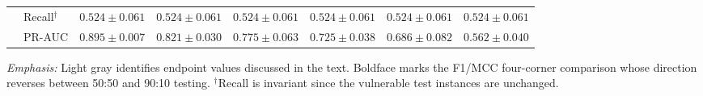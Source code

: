 \begin{table}[tbp]
{\begin{tabular}{llcccccc}
 & Recall$^{\dagger}$ & \cellcolor{black!10}$0.524 \pm 0.061$ & $0.524 \pm 0.061$ & $0.524 \pm 0.061$ & $0.524 \pm 0.061$ & $0.524 \pm 0.061$ & \cellcolor{black!10}$0.524 \pm 0.061$ \\
 & PR-AUC & $0.895 \pm 0.007$ & $0.821 \pm 0.030$ & $0.775 \pm 0.063$ & $0.725 \pm 0.038$ & $0.686 \pm 0.082$ & $0.562 \pm 0.040$ \\
\bottomrule
\end{tabular}}
\vspace{1mm}
\parbox{0.98\textwidth}{\footnotesize \textit{Emphasis:} Light gray identifies endpoint values discussed in the text. Boldface marks the F1/MCC four-corner comparison whose direction reverses between 50:50 and 90:10 testing. $^{\dagger}$Recall is invariant since the vulnerable test instances are unchanged.}
\end{table}
